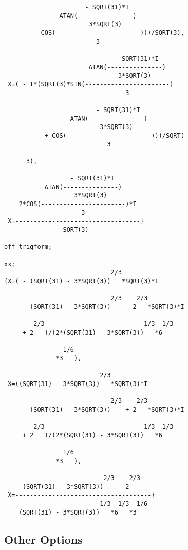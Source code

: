 \begin{verbatim}
                      - SQRT(31)*I
               ATAN(---------------)
                       3*SQRT(3)
        - COS(-----------------------)))/SQRT(3),
                         3

                              - SQRT(31)*I
                       ATAN(---------------)
                               3*SQRT(3)
 X=( - I*(SQRT(3)*SIN(-----------------------)
                                 3

                         - SQRT(31)*I
                  ATAN(---------------)
                          3*SQRT(3)
           + COS(-----------------------)))/SQRT(
                            3

      3),

                  - SQRT(31)*I
           ATAN(---------------)
                   3*SQRT(3)
    2*COS(-----------------------)*I
                     3
 X=----------------------------------}
                SQRT(3)

off trigform;

xx;
                             2/3
{X=( - (SQRT(31) - 3*SQRT(3))   *SQRT(3)*I

                             2/3    2/3
     - (SQRT(31) - 3*SQRT(3))    - 2   *SQRT(3)*I

        2/3                           1/3  1/3
     + 2   )/(2*(SQRT(31) - 3*SQRT(3))   *6

                1/6
              *3   ),

                          2/3
 X=((SQRT(31) - 3*SQRT(3))   *SQRT(3)*I

                             2/3    2/3
     - (SQRT(31) - 3*SQRT(3))    + 2   *SQRT(3)*I

        2/3                           1/3  1/3
     + 2   )/(2*(SQRT(31) - 3*SQRT(3))   *6

                1/6
              *3   ),

                           2/3    2/3
     (SQRT(31) - 3*SQRT(3))    - 2
 X=-------------------------------------}
                          1/3  1/3  1/6
    (SQRT(31) - 3*SQRT(3))   *6   *3
\end{verbatim}

\subsection{Other Options}

